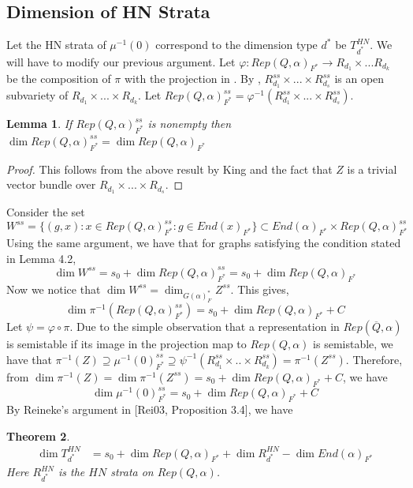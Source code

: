 \documentclass[12pt]{amsart}
\theoremstyle{plain}
\newtheorem{thm}{Theorem}[section]
\newtheorem{lem}[thm]{Lemma}
\theoremstyle{definition}
\theoremstyle{remark}
\begin{document}
\subsection{Dimension of HN Strata}
Let the HN strata of $\mu^{-1}(0)$ correspond to the dimension type $d^*$ be $T_{d^*}^{HN}$. We will have to modify our previous argument. Let $\varphi:Rep(Q,\alpha)_{F^*}\to R_{d_1}\times ...R_{d_k}$
be the composition of $\pi$ with the projection in \cite[Proposition 3.4]{reineke2003hn}. By \cite{king1994moduli}, $R_{d_1}^{ss}\times...\times R_{d_s}^{ss}$ is an open subvariety of $R_{d_1}\times...\times R_{d_k}$. Let 
$Rep(Q,\alpha)_{F^*}^{ss}=\varphi^{-1}(R_{d_1}^{ss}\times...\times R_{d_s}^{ss})$.
\begin{lem} If $Rep(Q,\alpha)_{F^*}^{ss}$ is nonempty then $\dim Rep(Q,\alpha)_{F^*}^{ss}=\dim Rep(Q,\alpha)_{F^*}$
\end{lem}
\begin{proof}
This follows from the above result by King and the fact that $Z$ is a trivial vector bundle over $R_{d_1}\times...\times R_{d_s}$. \end{proof}
Consider the set 
$$W^{ss}=\{(g,x):x\in Rep(Q,\alpha)_{F^*}^{ss}:g\in End(x)_{F^*}\}\subset End(\alpha)_{F^*}\times Rep(Q,\alpha)_{F^*}^{ss}$$
Using the same argument, we have that for graphs satisfying the condition stated in Lemma 4.2,
$$\dim W^{ss}=s_0+\dim Rep(Q,\alpha)_{F^*}^{ss}=s_0+\dim Rep(Q,\alpha)_{F^*}$$Now we notice that 
$\displaystyle\dim W^{ss}=\dim_{G(\alpha)_F^*}Z^{ss}$. This gives,
$$\dim \pi^{-1}(Rep(Q,\alpha)_{F^*}^{ss})=s_0+\dim Rep(Q,\alpha)_{F^*}+C$$
 Let $\displaystyle\psi=\varphi\circ\pi$. Due to the simple observation that a representation in $Rep(\overline{Q},\alpha)$ is semistable if its image in the projection map to $Rep(Q,\alpha)$ is semistable, we have that 
$\pi^{-1}(Z)\supseteq\mu^{-1}(0)^{ss}_{F^*}\supseteq \psi^{-1}(R_{d_1}^{ss}\times..\times R_{d_k}^{ss})=\pi^{-1}(Z^{ss})$.
Therefore, from $\dim\pi^{-1}(Z)=\dim \pi^{-1}(Z^{ss})=s_0+\dim Rep(Q,\alpha)_{F^*}+C$, we have 
$$\dim \mu^{-1}(0)_{F^*}^{ss}=s_0+\dim Rep(Q,\alpha)_{F^*}+C$$
By Reineke's argument in [Rei03, Proposition 3.4], we have 
\begin{thm}
\begin{align*}\dim T_{d^*}^{HN}&
=s_0+\dim Rep(Q,\alpha)_{F^*}+\dim R_{d^*}^{HN}-\dim End(\alpha)_{F^*}\end{align*}
Here $R_{d^*}^{HN}$ is the $HN$ strata on $Rep(Q,\alpha)$.
\end{thm}
\end{document}
